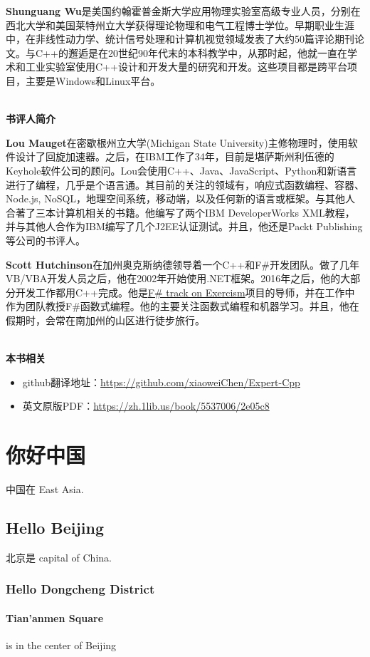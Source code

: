 \documentclass[11pt,a4paper,UTF8]{ctexart}
\begin{document}
	\textbf{Shunguang Wu}是美国约翰霍普金斯大学应用物理实验室高级专业人员，分别在西北大学和美国莱特州立大学获得理论物理和电气工程博士学位。早期职业生涯中，在非线性动力学、统计信号处理和计算机视觉领域发表了大约50篇评论期刊论文。与C++的邂逅是在20世纪90年代末的本科教学中，从那时起，他就一直在学术和工业实验室使用C++设计和开发大量的研究和开发。这些项目都是跨平台项目，主要是Windows和Linux平台。\par
	
	\hspace*{\fill} \\ %
	\noindent\textbf{书评人简介}\ \par
	\textbf{Lou Mauget}在密歇根州立大学(Michigan State University)主修物理时，使用软件设计了回旋加速器。之后，在IBM工作了34年，目前是堪萨斯州利伍德的Keyhole软件公司的顾问。Lou会使用C++、Java、JavaScript、Python和新语言进行了编程，几乎是个语言通。其目前的关注的领域有，响应式函数编程、容器、Node.js, NoSQL，地理空间系统，移动端，以及任何新的语言或框架。与其他人合著了三本计算机相关的书籍。他编写了两个IBM DeveloperWorks XML教程，并与其他人合作为IBM编写了几个J2EE认证测试。并且，他还是Packt Publishing等公司的书评人。 \par
	
	\textbf{Scott Hutchinson}在加州奥克斯纳德领导着一个C++和F\#开发团队。做了几年VB/VBA开发人员之后，他在2002年开始使用.NET框架。2016年之后，他的大部分开发工作都用C++完成。他是\href{https://github.com/exercism/fsharp}{F\# track on Exercism}项目的导师，并在工作中作为团队教授F\#函数式编程。他的主要关注函数式编程和机器学习。并且，他在假期时，会常在南加州的山区进行徒步旅行。 \par
	
	\hspace*{\fill} \\ %
	\noindent\textbf{本书相关}\ \par
	\begin{itemize}
		\item github翻译地址：\href{https://github.com/xiaoweiChen/Expert-Cpp}{https://github.com/xiaoweiChen/Expert-Cpp}
		\item 英文原版PDF：\href{https://zh.1lib.us/book/5537006/2e05c8}{https://zh.1lib.us/book/5537006/2e05c8}
	\end{itemize}


	\newpage
	
	\tableofcontents
	\newpage
	
	\section{你好中国}
	中国在 East Asia.
	\subsection{Hello Beijing}
	北京是 capital of China.
	\subsubsection{Hello Dongcheng District}
	\paragraph{Tian'anmen Square}
	is in the center of Beijing
\end{document}
